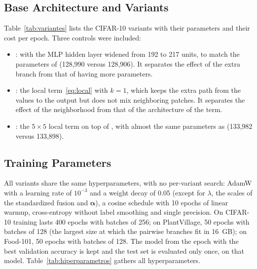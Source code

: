 \subsection{Base Architecture and Variants}
Table~\ref{tab:variantes} lists the CIFAR-10 variants with their parameters and their cost per epoch. Three controls were included:
\begin{itemize}
  \item {}:  with the MLP hidden layer widened from 192 to 217 units, to match the parameters of  (128,990 versus 128,906). It separates the effect of the extra branch from that of having more parameters.
  \item {}: the local term~\eqref{eq:local} with $k=1$, which keeps the extra path from the values to the output but does not mix neighboring patches. It separates the effect of the neighborhood from that of the architecture of the term.
  \item {}: the $5\times5$ local term on top of , with almost the same parameters as  (133,982 versus 133,898).
\end{itemize}



\subsection{Training Parameters}
\label{sec:entrenamiento}
All variants share the same hyperparameters, with no per-variant search: AdamW \citep{loshchilov2019decoupled} with a learning rate of $10^{-3}$ and a weight decay of 0.05 (except for $\lambda$, the scales of the standardized fusion and $\bm{\alpha}$), a cosine schedule \citep{loshchilov2017sgdr} with 10 epochs of linear warmup, cross-entropy without label smoothing and single precision. On CIFAR-10 training lasts 400 epochs with batches of 256; on PlantVillage, 50 epochs with batches of 128 (the largest size at which the pairwise branches fit in 16~GB); on Food-101, 50 epochs with batches of 128. The model from the epoch with the best validation accuracy is kept and the test set is evaluated only once, on that model. Table~\ref{tab:hiperparametros} gathers all hyperparameters.

